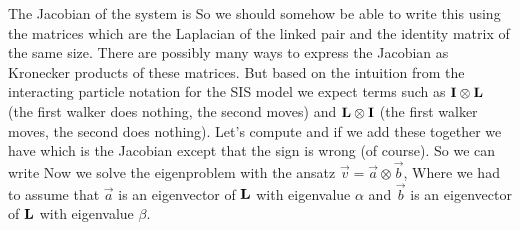 The Jacobian of the system is 
So we should somehow be able to write this using the matrices 
which are the Laplacian of the linked pair and the identity matrix of the same size. There are possibly many ways to express the Jacobian as Kronecker products of these matrices. But based on the intuition from the interacting particle notation for the SIS model we expect terms such as ${\bf I} \otimes {\bf L}$ (the first walker does nothing, the second moves) and ${\bf L} \otimes {\bf I}$ (the first walker moves, the second does nothing). Let's compute 
and if we add these together we have 
which is the Jacobian except that the sign is wrong (of course).
So we can write 
Now we solve the eigenproblem with the ansatz $\vec{v}=\vec{a}\otimes{\vec{b}}$, 
Where we had to assume that $\vec{a}$ is an eigenvector of $\bf L$ with eigenvalue $\alpha$ and $\vec{b}$ is an eigenvector of $\bf L$ with eigenvalue $\beta$. 

